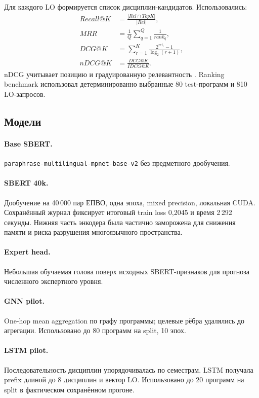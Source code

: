 \documentclass[twoside,11pt]{article}
\begin{document}
Для каждого LO формируется список дисциплин-кандидатов. Использовались:
\begin{align}
  Recall@K &=
  \frac{|Rel\cap TopK|}{|Rel|},\\
  MRR &= \frac{1}{Q}\sum_{q=1}^{Q}\frac{1}{rank_q},\\
  DCG@K &= \sum_{r=1}^{K}\frac{2^{rel_r}-1}{\log_2(r+1)},\\
  nDCG@K &= \frac{DCG@K}{IDCG@K}.
  \label{eq:ranking-metrics}
\end{align}
nDCG учитывает позицию и градуированную релевантность \cite{Jarvelin2002}. Ranking benchmark использовал детерминированно выбранные 80 test-программ и 810 LO-запросов.

\subsection{Модели}

\paragraph{Base SBERT.}
\texttt{paraphrase-multilingual-mpnet-base-v2} без предметного дообучения.

\paragraph{SBERT 40k.}
Дообучение на 40\,000 пар ЕПВО, одна эпоха, mixed precision, локальная CUDA. Сохранённый журнал фиксирует итоговый train loss 0,2045 и время 2\,292 секунды. Нижняя часть энкодера была частично заморожена для снижения памяти и риска разрушения многоязычного пространства.

\paragraph{Expert head.}
Небольшая обучаемая голова поверх исходных SBERT-признаков для прогноза численного экспертного уровня.

\paragraph{GNN pilot.}
One-hop mean aggregation по графу программы; целевые рёбра удалялись до агрегации. Использовано до 80 программ на split, 10 эпох.

\paragraph{LSTM pilot.}
Последовательность дисциплин упорядочивалась по семестрам. LSTM получала prefix длиной до 8 дисциплин и вектор LO. Использовано до 20 программ на split в фактическом сохранённом прогоне.
\end{document}

